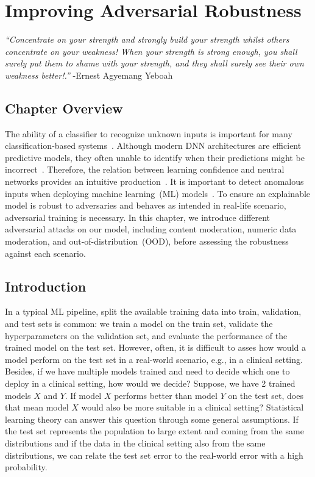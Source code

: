 \chapter{Improving Adversarial Robustness} \label{chapter:robustness}
\textit{``Concentrate on your strength and strongly build your strength whilst others concentrate on your weakness! When your strength is strong enough, you shall surely put them to shame with your strength, and they shall surely see their own weakness better!.''} -Ernest Agyemang Yeboah 

\section{Chapter Overview}
The ability of a classifier to recognize unknown inputs is important for many classification-based systems~\cite{OOD15}. Although modern DNN architectures are efficient predictive models, they often unable to identify when their predictions might be incorrect~\cite{OOD3}. Therefore, the relation between learning confidence and neutral networks provides an intuitive production~\cite{OOD3}.
It is important to detect anomalous inputs when deploying machine learning~(ML) models~\cite{OOD5}. To ensure an explainable model is robust to adversaries and behaves as intended in real-life scenario, adversarial training is necessary. In this chapter, we introduce different adversarial attacks on our model, including content moderation, numeric data moderation, and out-of-distribution~(OOD), before assessing the robustness against each scenario. 

\section{Introduction}
In a typical ML pipeline, split the available training data into train, validation, and test sets is common: we train a model on the train set, validate the hyperparameters on the validation set, and evaluate the performance of the trained model on the test set. However, often, it is difficult to asses how would a model perform on the test set in a real-world scenario, e.g., in a clinical setting. Besides, if we have multiple models trained and need to decide which one to deploy in a clinical setting, how would we decide? Suppose, we have 2 trained models $X$ and $Y$. If model $X$ performs better than model $Y$ on the test set, does that mean model $X$ would also be more suitable in a clinical setting? Statistical learning theory can answer this question through some general assumptions. If the test set represents the population to large extent and coming from the same distributions and if the data in the clinical setting also from the same distributions, we can relate the test set error to the real-world error with a high probability. 

